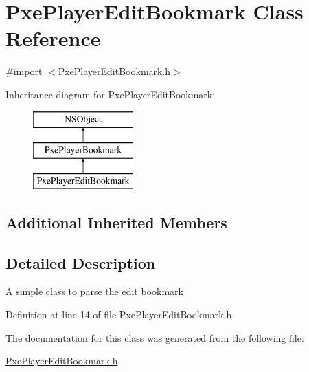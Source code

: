 \hypertarget{interface_pxe_player_edit_bookmark}{\section{Pxe\-Player\-Edit\-Bookmark Class Reference}
\label{interface_pxe_player_edit_bookmark}
}


{\ttfamily \#import $<$Pxe\-Player\-Edit\-Bookmark.\-h$>$}

Inheritance diagram for Pxe\-Player\-Edit\-Bookmark\-:\begin{figure}[H]
\begin{center}
\leavevmode
\includegraphics[height=3.000000cm]{interface_pxe_player_edit_bookmark}
\end{center}
\end{figure}
\subsection*{Additional Inherited Members}


\subsection{Detailed Description}
A simple class to parse the edit bookmark 

Definition at line 14 of file Pxe\-Player\-Edit\-Bookmark.\-h.



The documentation for this class was generated from the following file\-:\begin{DoxyCompactItemize}
\item 
\hyperlink{_pxe_player_edit_bookmark_8h}{Pxe\-Player\-Edit\-Bookmark.\-h}\end{DoxyCompactItemize}
